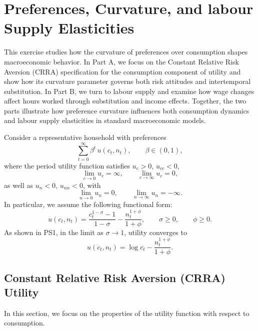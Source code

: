 \documentclass[dvipsnames,11pt]{article}
\begin{document}
\begin{enumerate}
\begin{solution}
            \end{solution}
            
        \end{enumerate}

\newpage

\section{Preferences, Curvature, and labour Supply Elasticities}

    \noindent This exercise studies how the curvature of preferences over consumption shapes macroeconomic behavior. In Part A, we focus on the Constant Relative Risk Aversion (CRRA) specification for the consumption component of utility and show how its curvature parameter governs both risk attitudes and intertemporal substitution. In Part B, we turn to labour supply and examine how wage changes affect hours worked through substitution and income effects. Together, the two parts illustrate how preference curvature influences both consumption dynamics and labour supply elasticities in standard macroeconomic models.

    \medskip

    \noindent Consider a representative household with preferences
    \[
    \sum_{t=0}^{\infty} \beta^t \, u(c_t,n_t), 
    \qquad \beta \in (0,1),
    \]
    where the period utility function satisfies $u_c>0$, $u_{cc}<0$,
    \[
    \lim_{c \to 0} u_c = \infty, 
    \qquad 
    \lim_{c \to \infty} u_c = 0,
    \]
    as well as $u_n<0$, $u_{nn}<0$, with
    \[
    \lim_{n \to 0} u_n = 0, 
    \qquad 
    \lim_{n \to \infty} u_{n} = -\infty .
    \]
    In particular, we assume the following functional form:
    \[
    u(c_t,n_t)
    =
    \frac{c_t^{1-\sigma}-1}{1-\sigma}
    -
    \frac{n_t^{1+\phi}}{1+\phi},
    \qquad 
    \sigma \ge 0, 
    \qquad 
    \phi \ge 0.
    \]
    As shown in PS1, in the limit as $\sigma \to 1$, utility converges to
    \[
    u(c_t,n_t)
    =
    \log c_t
    -
    \frac{n_t^{1+\phi}}{1+\phi}.
    \]

    \subsection{Constant Relative Risk Aversion (CRRA) Utility}
        
        In this section, we focus on the properties of the utility function with respect to consumption.
        
\end{document}
